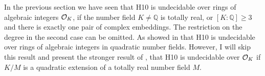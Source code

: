 
In the previous section we have seen that \textsc{H10} is undecidable over rings
of algebraic integers \(\mathcal{O}_{K}\), if the number field \(K ≠ ℚ\) is totally
real, or \([K : ℚ] ≥ 3\) and there is exactly one pair of complex embeddings.
The restriction on the degree in the second case can be omitted. As
\textcite{Denef1975} showed in \citeyear{Denef1975} that \textsc{H10} is
undecidable over rings of algebraic integers in quadratic number fields.
However, I will skip this result and present the stronger result of
\textcite{Denef1978}, that \textsc{H10} is undecidable over \(\mathcal{O}_{K}\) if \(K /
M\) is a quadratic extension of a totally real number field \(M\).
